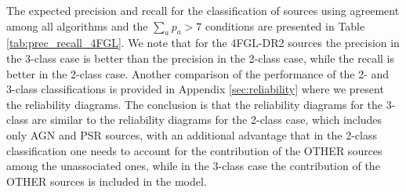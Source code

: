 \documentclass{aa}
\begin{document}
The expected precision and recall for the classification of sources using agreement among all algorithms and the
$\sum_a p_a > 7$ conditions are presented in Table \ref{tab:prec_recall_4FGL}.
We note that for the 4FGL-DR2 sources the
precision in the 3-class case is better than the precision in the 2-class case, while the recall is better in the 2-class case.
Another comparison of the performance of the 2- and 3-class classifications is provided in Appendix \ref{sec:reliability} where we present the reliability diagrams.
The conclusion is that the reliability diagrams for the 3-class are similar to the reliability diagrams for the 2-class case, which includes only AGN and PSR sources, with an additional advantage that in the 2-class classification one needs to account for the contribution of the OTHER sources among the unassociated ones, while in the 3-class case the contribution of the OTHER sources is included in the model.

\begin{table}[!h]
    \caption{Testing accuracy of the four selected algorithms for the 3-class classification of 4FGL-DR2 sources.}
    \label{tab:selected_algs_4fgl_multi}

\centering
\hspace{-0.2cm}
\end{table}
\end{document}
